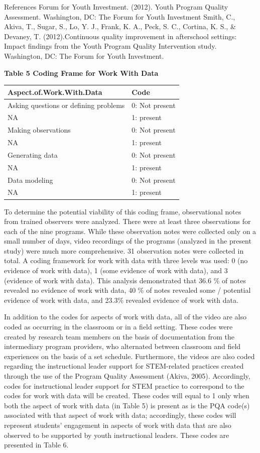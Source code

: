 \documentclass[]{book}
\theoremstyle{definition}
\theoremstyle{definition}
\theoremstyle{definition}
\theoremstyle{remark}
\begin{document}
References Forum for Youth Investment. (2012). Youth Program Quality
Assessment. Washington, DC: The Forum for Youth Investment Smith, C.,
Akiva, T., Sugar, S., Lo, Y. J., Frank, K. A., Peck, S. C., Cortina, K.
S., \& Devaney, T. (2012).Continuous quality improvement in afterschool
settings: Impact findings from the Youth Program Quality Intervention
study. Washington, DC: The Forum for Youth Investment.

\textbf{Table 5 Coding Frame for Work With Data}

\begin{tabular}{ll}
\toprule
Aspect.of.Work.With.Data & Code\\
\midrule
Asking questions or defining problems & 0: Not present\\
NA & 1: present\\
Making observations & 0: Not present\\
NA & 1: present\\
Generating data & 0: Not present\\
\addlinespace
NA & 1: present\\
Data modeling & 0: Not present\\
NA & 1: present\\
\bottomrule
\end{tabular}

To determine the potential viability of this coding frame, observational
notes from trained observers were analyzed. There were at least three
observations for each of the nine programs. While these observation
notes were collected only on a small number of days, video recordings of
the programs (analyzed in the present study) were much more
comprehensive. 31 observation notes were collected in total. A coding
framework for work with data with three levels was used: 0 (no evidence
of work with data), 1 (some evidence of work with data), and 3 (evidence
of work with data). This analysis demonstrated that 36.6 \% of notes
revealed no evidence of work with data, 40 \% of notes revealed some /
potential evidence of work with data, and 23.3\% revealed evidence of
work with data.

In addition to the codes for aspects of work with data, all of the video
are also coded as occurring in the classroom or in a field setting.
These codes were created by research team members on the basis of
documentation from the intermediary program providers, who alternated
between classroom and field experiences on the basis of a set schedule.
Furthermore, the videos are also coded regarding the instructional
leader support for STEM-related practices created through the use of the
Program Quality Assessment (Akiva, 2005). Accordingly, codes for
instructional leader support for STEM practice to correspond to the
codes for work with data will be created. These codes will equal to 1
only when both the aspect of work with data (in Table 5) is present as
is the PQA code(s) associated with that aspect of work with data;
accordingly, these codes will represent students' engagement in aspects
of work with data that are also observed to be supported by youth
instructional leaders. These codes are presented in Table 6.
\end{document}
